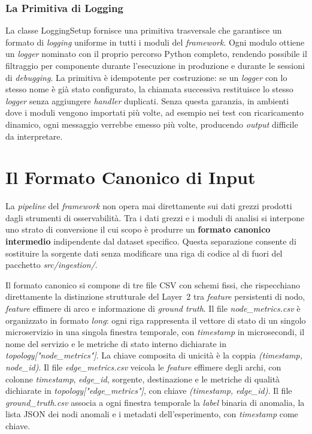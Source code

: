 \subsubsection{La Primitiva di Logging}
\label{subsec:logging_setup}

La classe LoggingSetup fornisce una primitiva trasversale che garantisce un formato di
\textit{logging} uniforme in tutti i moduli del \textit{framework}. Ogni modulo ottiene un
\textit{logger} nominato con il proprio percorso Python completo, rendendo possibile il
filtraggio per componente durante l'esecuzione in produzione e durante le sessioni di
\textit{debugging}. La primitiva è idempotente per costruzione: se un \textit{logger} con
lo stesso nome è già stato configurato, la chiamata successiva restituisce lo stesso
\textit{logger} senza aggiungere \textit{handler} duplicati. Senza questa garanzia, in ambienti
dove i moduli vengono importati più volte, ad esempio nei test con ricaricamento dinamico,
ogni messaggio verrebbe emesso più volte, producendo \textit{output} difficile da interpretare.

\section{Il Formato Canonico di Input}
\label{sec:etl_converter}

La \textit{pipeline} del \textit{framework} non opera mai direttamente sui dati grezzi
prodotti dagli strumenti di osservabilità. Tra i dati grezzi e i moduli di analisi si
interpone uno strato di conversione il cui scopo è produrre un \textbf{formato canonico
intermedio} indipendente dal dataset specifico. Questa separazione consente di sostituire
la sorgente dati senza modificare una riga di codice al di fuori del pacchetto
\textit{src/ingestion/}.

Il formato canonico si compone di tre file CSV con schemi fissi, che rispecchiano direttamente
la distinzione strutturale del Layer~2 tra \textit{feature} persistenti di nodo, \textit{feature}
effimere di arco e informazione di \textit{ground truth}. Il file \textit{node\_metrics.csv} è
organizzato in formato \textit{long}: ogni riga rappresenta il vettore di stato di un singolo
microservizio in una singola finestra temporale, con \textit{timestamp} in microsecondi, il
nome del servizio e le metriche di stato interno dichiarate in
\textit{topology["node\_metrics"]}. La chiave composita di unicità è la coppia
\textit{(timestamp, node\_id)}. Il file \textit{edge\_metrics.csv} veicola le
\textit{feature} effimere degli archi, con colonne \textit{timestamp}, \textit{edge\_id},
sorgente, destinazione e le metriche di qualità dichiarate in
\textit{topology["edge\_metrics"]}, con chiave \textit{(timestamp, edge\_id)}. Il file
\textit{ground\_truth.csv} associa a ogni finestra temporale la \textit{label} binaria di
anomalia, la lista JSON dei nodi anomali e i metadati dell'esperimento, con
\textit{timestamp} come chiave.

